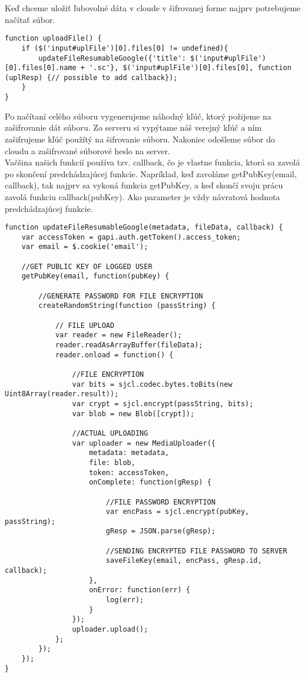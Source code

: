 		Keď chceme uložiť ľubovolné dáta v cloude v šifrovanej forme najprv potrebujeme načítať súbor.
\medskip
\begin{lstlisting}[caption=Načítanie súboru]		
function uploadFile() {
    if ($('input#uplFile')[0].files[0] != undefined){
        updateFileResumableGoogle({'title': $('input#uplFile')[0].files[0].name + '.sc'}, $('input#uplFile')[0].files[0], function (uplResp) {// possible to add callback});
    }
}
\end{lstlisting}		

		Po načítaní celého súboru vygenerujeme náhodný kľúč, ktorý požijeme na zašifrovanie dát súboru. Zo serveru si vypýtame náš verejný kľúč a ním zašifrujeme kľúč použítý na šifrovanie súboru. Nakoniec odošleme súbor do cloudu a zašifrované súborové heslo na server. \\
		Vačšina našich funkcií používa tzv. callback, čo je vlastne funkcia, ktorá sa zavolá po skončení predchádzajúcej funkcie. Napríklad, keď zavoláme getPubKey(email, callback), tak najprv sa vykoná funkcia getPubKey, a keď skončí svoju prácu zavolá funkciu callback(pubKey). Ako parameter je vždy návratová hodnota predchádzajúcej funkcie.
		
\medskip
\begin{lstlisting}[caption=Upload súboru, firstnumber=6]		
function updateFileResumableGoogle(metadata, fileData, callback) {
    var accessToken = gapi.auth.getToken().access_token;
    var email = $.cookie('email');

    //GET PUBLIC KEY OF LOGGED USER
    getPubKey(email, function(pubKey) {

        //GENERATE PASSWORD FOR FILE ENCRYPTION
        createRandomString(function (passString) {

            // FILE UPLOAD
            var reader = new FileReader();
            reader.readAsArrayBuffer(fileData);
            reader.onload = function() {
            
                //FILE ENCRYPTION
                var bits = sjcl.codec.bytes.toBits(new Uint8Array(reader.result));
                var crypt = sjcl.encrypt(passString, bits);
                var blob = new Blob([crypt]);

                //ACTUAL UPLOADING
                var uploader = new MediaUploader({
                    metadata: metadata,
                    file: blob,
                    token: accessToken,
                    onComplete: function(gResp) {

                        //FILE PASSWORD ENCRYPTION
                        var encPass = sjcl.encrypt(pubKey, passString);
                        gResp = JSON.parse(gResp);

                        //SENDING ENCRYPTED FILE PASSWORD TO SERVER
                        saveFileKey(email, encPass, gResp.id, callback);
                    },
                    onError: function(err) {
                        log(err);
                    }
                });
                uploader.upload();
            };
        });
    });
}
\end{lstlisting}		
	
